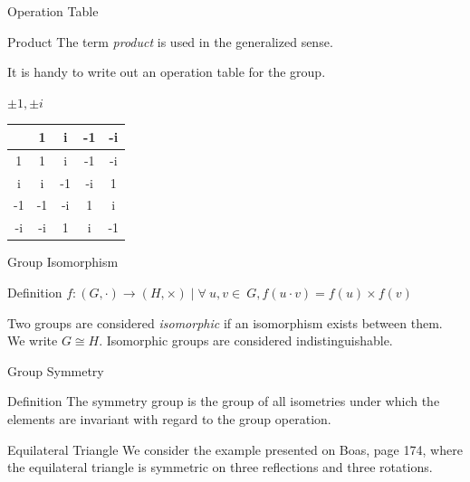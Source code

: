 \documentclass{beamer}
\begin{document}
\begin{frame}{Operation Table}
    \begin{block}{Product}
        The term \emph{product} is used in the generalized sense.
    \end{block}
    It is handy to write out an operation table for the group.
    \begin{exampleblock}{$\pm 1, \pm i$}
        \begin{center}
            \begin{tabular}{c|cccc}
                & 1 & i & -1 & -i \\
                \hline
                1 & 1 & i & -1 & -i \\
                i & i & -1 & -i & 1 \\
                -1 & -1 & -i & 1 & i \\
                -i & -i & 1 & i & -1
            \end{tabular}
        \end{center}
    \end{exampleblock}
\end{frame}

\begin{frame}{Group Isomorphism}
    \begin{block}{Definition}
        $f: (G,\cdot)\rightarrow (H,\times) \mid \forall\ u, v \in\ G, f(u\cdot v) = f(u)\times f(v)$
    \end{block}
    Two groups are considered \emph{isomorphic} if an isomorphism exists between them.  We write $G\cong H$.  Isomorphic groups are considered indistinguishable.
\end{frame}

\begin{frame}{Group Symmetry}
    \begin{block}{Definition}
        The symmetry group is the group of all isometries under which the elements are invariant with regard to the group operation.
    \end{block}
    \begin{exampleblock}{Equilateral Triangle}
        We consider the example presented on Boas, page 174, where the equilateral triangle is symmetric on three reflections and three rotations.
    \end{exampleblock}
\end{frame}
\end{document}
